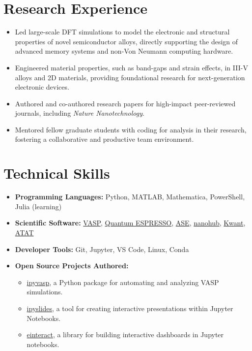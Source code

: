 \documentclass[letter,11pt]{article}
\begin{document}
\section{Research Experience}
\begin{itemize}
    \item Led large-scale DFT simulations to model the electronic and structural properties of novel semiconductor alloys, directly supporting the design of advanced memory systems and non-Von Neumann computing hardware.
    \item Engineered material properties, such as band-gaps and strain effects, in III-V alloys and 2D materials, providing foundational research for next-generation electronic devices.
    \item Authored and co-authored research papers for high-impact peer-reviewed journals, including \textit{Nature Nanotechnology}.
    \item Mentored fellow graduate students with coding for analysis in their research, fostering a collaborative and productive team environment.
\end{itemize}

\section{Technical Skills}
\begin{itemize}
    \item \textbf{Programming Languages:} Python, MATLAB, Mathematica, PowerShell, Julia (learning)
    \item \textbf{Scientific Software:} \href{https://www.vasp.at/}{VASP}, \href{https://www.quantum-espresso.org/}{Quantum ESPRESSO}, \href{https://wiki.fysik.dtu.dk/ase/}{ASE}, \href{https://nanohub.org}{nanohub}, \href{https://kwant-project.org}{Kwant}, \href{https://axelvandewalle.github.io/www-avdw/atat/}{ATAT}
    \item \textbf{Developer Tools:} Git, Jupyter, VS Code, Linux, Conda
    \item \textbf{Open Source Projects Authored:}
    \begin{itemize}
        \item \href{https://github.com/asaboor-gh/ipyvasp}{ipyvasp}, a Python package for automating and analyzing VASP simulations.
        \item \href{https://github.com/asaboor-gh/ipyslides}{ipyslides}, a tool for creating interactive presentations within Jupyter Notebooks.
        \item \href{https://github.com/asaboor-gh/einteract}{einteract}, a library for building interactive dashboards in Jupyter notebooks.
    \end{itemize}
\end{itemize}
\end{document}

